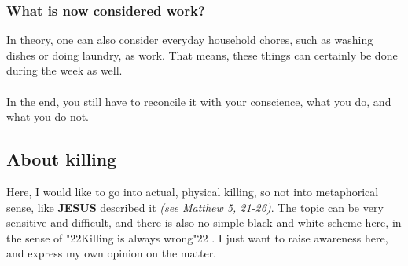 \documentclass[12pt,a5paper]{article}
\newcommand{\Jesus}[0]{\textbf{JESUS}}
\newcommand{\q}[1]{\char"22{#1}\char"22 }
\begin{document}
	\subsubsection{What is now considered work?}
		In theory,
		one can also consider everyday household chores,
		such as washing dishes or doing laundry,
		as work.
		That means,
		these things can certainly be done during the week as well.
		\\
		\\
		In the end,
		you still have to reconcile it with your conscience,
		what you do,
		and what you do not.

	\newpage
	\subsection{About killing} \label{VomToeten}
		Here,
		I would like to go into actual,
		physical killing,
		so not into metaphorical sense,
		like {\Jesus} described it
		\textit{(see \href{https://www.die-bibel.de/bibeln/online-bibeln/lesen/ESV/MAT.5/Matthew-5}{Matthew 5, 21-26})}.
		The topic can be very sensitive and difficult,
		and there is also no simple black-and-white scheme here,
		in the sense of \q{Killing is always wrong}.
		I just want to raise awareness here,
		and express my own opinion on the matter.
\end{document}
